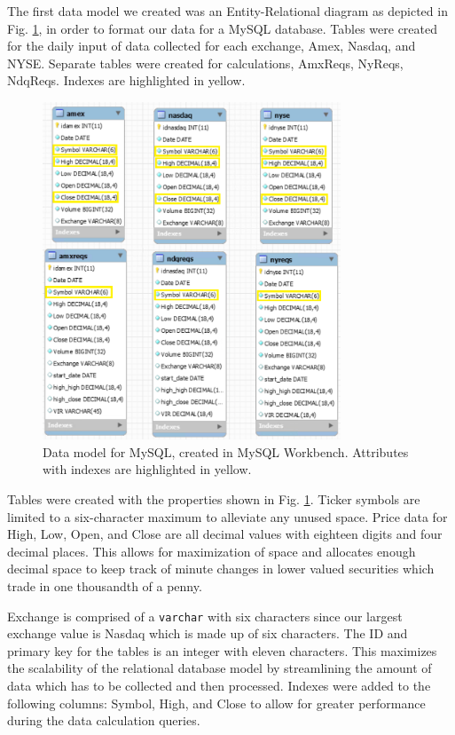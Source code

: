 \documentclass{IEEEtran}
\begin{document}
The first data model we created was an Entity-Relational diagram as depicted in Fig. \ref{fig:mysql_model}, in order to format our data for a MySQL database. Tables were created for the daily input of data collected for each exchange, Amex, Nasdaq, and NYSE. Separate tables were created for calculations, AmxReqs, NyReqs, NdqReqs. Indexes are highlighted in yellow.

\begin{figure}
	\centering
	\includegraphics[width=3.5in]{Images/mysql_data_model.png}
	\caption{Data model for MySQL, created in MySQL Workbench. Attributes with indexes are highlighted in yellow.}
	\label{fig:mysql_model}
\end{figure}

Tables were created with the properties shown in Fig. \ref{fig:mysql_model}. Ticker symbols are limited to a six-character maximum to alleviate any unused space. Price data for High, Low, Open, and Close are all decimal values with eighteen digits and four decimal places. This allows for maximization of space and allocates enough decimal space to keep track of minute changes in lower valued securities which trade in one thousandth of a penny.  

Exchange is comprised of a \texttt{varchar} with six characters since our largest exchange value is Nasdaq which is made up of six characters. The ID and primary key for the tables is an integer with eleven characters. This maximizes the scalability of the relational database model by streamlining the amount of data which has to be collected and then processed. Indexes were added to the following columns: Symbol, High, and Close to allow for greater performance during the data calculation queries. 
\end{document}
